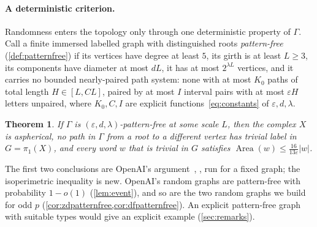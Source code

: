\documentclass[11pt]{article}
\newtheorem{theorem}{Theorem}
\theoremstyle{definition}
\theoremstyle{plain}
\newcommand{\eps}{\varepsilon}
\newcommand{\Area}{\operatorname{Area}}
\begin{document}
\paragraph{A deterministic criterion.} Randomness enters the topology only through one deterministic property of $\Gamma$. Call a finite immersed labelled graph with distinguished roots \emph{pattern-free} (\cref{def:patternfree}) if its vertices have degree at least $5$, its girth is at least $L\ge3$, its components have diameter at most $dL$, it has at most $2^{\lambda L}$ vertices, and it carries no bounded nearly-paired path system: none with at most $K_0$ paths of total length $H\in[L,CL]$, paired by at most $I$ interval pairs with at most $\eps H$ letters unpaired, where $K_0,C,I$ are explicit functions~\eqref{eq:constants} of $\eps,d,\lambda$.

\begin{theorem}\label{thm:C}
If $\Gamma$ is $(\eps,d,\lambda)$-pattern-free at some scale $L$, then the complex $X$ is aspherical, no path in $\Gamma$ from a root to a different vertex has trivial label in $G=\pi_1(X)$, and every word $w$ that is trivial in $G$ satisfies $\Area(w)\le\frac{16}{13\eps}|w|$.
\end{theorem}

\noindent The first two conclusions are OpenAI's argument~\cite[Prop.~4.5 and \S5]{OAI196}, \cite[Thm.~5.2 and \S6]{OAI197a}, run for a fixed graph; the isoperimetric inequality is new. OpenAI's random graphs are pattern-free with probability $1-o(1)$ (\cref{lem:event}), and so are the two random graphs we build for odd $p$ (\cref{cor:zdpatternfree,cor:dfpatternfree}). An explicit pattern-free graph with suitable types would give an explicit example (\cref{sec:remarks}).
\end{document}
